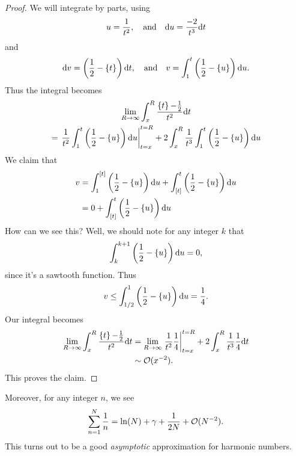\begin{proof}
We will integrate by parts, using
\begin{equation}
u=\frac{1}{t^{2}},\quad\mbox{and}\quad\mathrm{d} u=\frac{-2}{t^{3}}\mathrm{d} t
\end{equation}
and
\begin{equation}
\mathrm{d} v =\left(\frac{1}{2}-\mathop{\{}\nolimits\!t\!\mathop{\}}\nolimits\right)\mathrm{d} t,\quad\mbox{and}\quad
v = \int^{t}_{1}\left(\frac{1}{2}-\mathop{\{}\nolimits\!u\!\mathop{\}}\nolimits\right)\mathrm{d} u.
\end{equation}
Thus the integral becomes
\begin{multline}
\lim_{R\to\infty}\int^{R}_{x}\frac{\mathop{\{}\nolimits\!t\!\mathop{\}}\nolimits-\frac{1}{2}}{t^{2}}\mathrm{d} t\\
=\left.\frac{1}{t^{2}}\int^{t}_{1}\left(\frac{1}{2}-\mathop{\{}\nolimits\!u\!\mathop{\}}\nolimits\right)\mathrm{d} u\right|^{t=R}_{t=x}
+2\int^{R}_{x}\frac{1}{t^{3}}\int^{t}_{1}\left(\frac{1}{2}-\mathop{\{}\nolimits\!u\!\mathop{\}}\nolimits\right)\mathrm{d} u
\end{multline}
We claim that
\begin{equation}
\begin{split}
v &= \int^{[t]}_{1}
\left(\frac{1}{2}-\mathop{\{}\nolimits\!u\!\mathop{\}}\nolimits\right)\mathrm{d} u
+\int^{t}_{[t]}
\left(\frac{1}{2}-\mathop{\{}\nolimits\!u\!\mathop{\}}\nolimits\right)\mathrm{d} u\\
&=0+\int^{t}_{[t]}
\left(\frac{1}{2}-\mathop{\{}\nolimits\!u\!\mathop{\}}\nolimits\right)\mathrm{d} u
\end{split}
\end{equation}
How can we see this? Well, we should note for any integer $k$ that
\begin{equation}
\int^{k+1}_{k}\left(\frac{1}{2}-\mathop{\{}\nolimits\!u\!\mathop{\}}\nolimits\right)\mathrm{d} u=0,
\end{equation}
since it's a sawtooth function. Thus
\begin{equation}
v\leq\int^{1}_{1/2}\left(\frac{1}{2}-\mathop{\{}\nolimits\!u\!\mathop{\}}\nolimits\right)\mathrm{d}
u=\frac{1}{4}.
\end{equation}
Our integral becomes
\begin{equation}
\begin{split}
\lim_{R\to\infty}\int^{R}_{x}\frac{\mathop{\{}\nolimits\!t\!\mathop{\}}\nolimits-\frac{1}{2}}{t^{2}}\mathrm{d} t
&=\lim_{R\to\infty}\left.\frac{1}{t^{2}}\frac{1}{4}\right|^{t=R}_{t=x}
+2\int^{R}_{x}\frac{1}{t^{3}}\frac{1}{4}\mathrm{d} t\\
&\sim\mathcal{O}(x^{-2}).
\end{split}
\end{equation}
This proves the claim.
\end{proof}
Moreover, for any integer $n$, we see
\begin{equation}
\sum^{N}_{n=1}\frac{1}{n} = \ln(N)+\gamma+\frac{1}{2N}+\mathcal{O}(N^{-2}).
\end{equation}
This turns out to be a good \emph{asymptotic} approximation for harmonic
numbers. 
